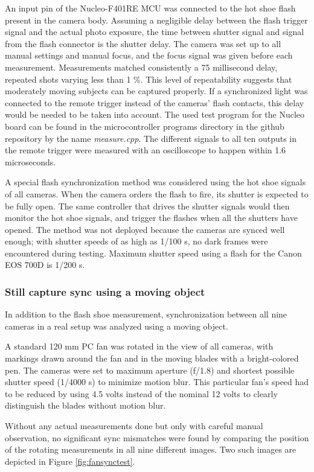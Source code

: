An input pin of the Nucleo-F401RE MCU was connected to the hot shoe flash present in the camera body.
Assuming a negligible delay between the flash trigger signal and the actual photo exposure, the time between shutter signal and signal from the flash connector is the shutter delay.
The camera was set up to all manual settings and manual focus, and the focus signal was given before each measurement.
Measurements matched consistently a 75 millisecond delay, repeated shots varying less than 1 \%.
This level of repeatability suggests that moderately moving subjects can be captured properly.
If a synchronized light was connected to the remote trigger instead of the cameras' flash contacts, this delay would be needed to be taken into account.
The used test program for the Nucleo board can be found in the microcontroller programs directory in the github repository by the name \emph{measure.cpp}.
The different signals to all ten outputs in the remote trigger were measured with an oscilloscope to happen within 1.6 microseconds.

A special flash synchronization method was considered using the hot shoe signals of all cameras.
When the camera orders the flash to fire, its shutter is expected to be fully open.
The same controller that drives the shutter signals would then monitor the hot shoe signals, and trigger the flashes when all the shutters have opened.
The method was not deployed because the cameras are synced well enough; with shutter speeds of as high as 1/100 s, no dark frames were encountered during testing.
Maximum shutter speed using a flash for the Canon EOS 700D is 1/200 s.

\subsubsection{Still capture sync using a moving object}

In addition to the flash shoe measurement, synchronization between all nine cameras in a real setup was analyzed using a moving object.

A standard 120 mm PC fan was rotated in the view of all cameras, with markings drawn around the fan and in the moving blades with a bright-colored pen.
The cameras were set to maximum aperture (f/1.8) and shortest possible shutter speed (1/4000 s) to minimize motion blur.
This particular fan's speed had to be reduced by using 4.5 volts instead of the nominal 12 volts to clearly distinguish the blades without motion blur.

Without any actual measurements done but only with careful manual observation, no significant sync mismatches were found by comparing the position of the rotating measurements in all nine different images.
Two such images are depicted in Figure \ref{fig:fansynctest}.

